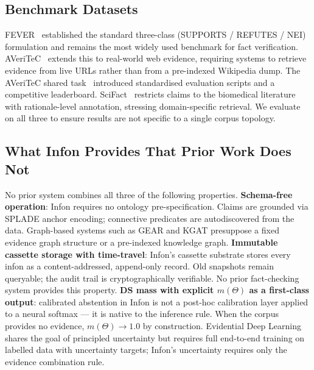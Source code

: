 \subsection{Benchmark Datasets}
\label{sec:related_work:datasets}

FEVER~\cite{thorne2018fever} established the standard three-class
(SUPPORTS / REFUTES / NEI) formulation and remains the most widely used
benchmark for fact verification.  AVeriTeC~\cite{schlichtkrull2023averitec}
extends this to real-world web evidence, requiring systems to retrieve
evidence from live URLs rather than from a pre-indexed Wikipedia dump.  The
AVeriTeC shared task~\cite{averitec2024sharedtask} introduced standardised
evaluation scripts and a competitive leaderboard.  SciFact~\cite{wadden2020scifact}
restricts claims to the biomedical literature with rationale-level
annotation, stressing domain-specific retrieval.  We evaluate on all three
to ensure results are not specific to a single corpus topology.

\subsection{What Infon Provides That Prior Work Does Not}
\label{sec:related_work:differentiators}

No prior system combines all three of the following properties.
\textbf{Schema-free operation}: Infon requires no ontology
pre-specification.  Claims are grounded via SPLADE anchor encoding;
connective predicates are autodiscovered from the data.  Graph-based
systems such as GEAR and KGAT presuppose a fixed evidence graph structure
or a pre-indexed knowledge graph.  \textbf{Immutable cassette storage with
time-travel}: Infon's cassette substrate stores every infon as a
content-addressed, append-only record.  Old snapshots remain queryable;
the audit trail is cryptographically verifiable.  No prior fact-checking
system provides this property.  \textbf{DS mass with explicit $m(\Theta)$
as a first-class output}: calibrated abstention in Infon is not a
post-hoc calibration layer applied to a neural softmax — it is native to
the inference rule.  When the corpus provides no evidence, $m(\Theta) \to
1.0$ by construction.  Evidential Deep Learning~\cite{sensoy2018evidential}
shares the goal of principled uncertainty but requires full end-to-end
training on labelled data with uncertainty targets; Infon's uncertainty
requires only the evidence combination rule.
